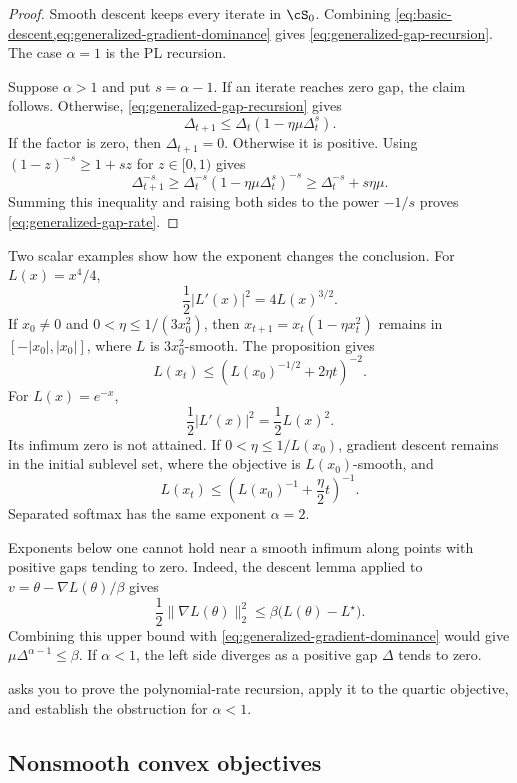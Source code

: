 \documentclass[11pt,twoside]{article}
\theoremstyle{definition}
\theoremstyle{remark}
\begin{document}
\begin{proof}
Smooth descent keeps every iterate in $\cS_0$. Combining
\cref{eq:basic-descent,eq:generalized-gradient-dominance} gives
\cref{eq:generalized-gap-recursion}. The case $\alpha=1$ is the PL
recursion.

Suppose $\alpha>1$ and put $s=\alpha-1$. If an iterate reaches zero gap, the
claim follows. Otherwise, \cref{eq:generalized-gap-recursion} gives
\[
 \Delta_{t+1}\le\Delta_t(1-\eta\mu\Delta_t^s).
\]
If the factor is zero, then $\Delta_{t+1}=0$. Otherwise it is positive. Using
$(1-z)^{-s}\ge1+sz$ for $z\in[0,1)$ gives
\[
 \Delta_{t+1}^{-s}
 \ge \Delta_t^{-s}(1-\eta\mu\Delta_t^s)^{-s}
 \ge \Delta_t^{-s}+s\eta\mu.
\]
Summing this inequality and raising both sides to the power $-1/s$ proves
\cref{eq:generalized-gap-rate}.
\end{proof}

Two scalar examples show how the exponent changes the conclusion. For
$L(x)=x^4/4$,
\[
 \frac12|L'(x)|^2=4L(x)^{3/2}.
\]
If $x_0\ne0$ and $0<\eta\le1/(3x_0^2)$, then
$x_{t+1}=x_t(1-\eta x_t^2)$ remains in $[-|x_0|,|x_0|]$, where $L$ is
$3x_0^2$-smooth. The proposition gives
\[
 L(x_t)\le\left(L(x_0)^{-1/2}+2\eta t\right)^{-2}.
\]
For $L(x)=e^{-x}$,
\[
 \frac12|L'(x)|^2=\frac12L(x)^2.
\]
Its infimum zero is not attained. If $0<\eta\le1/L(x_0)$, gradient descent
remains in the initial sublevel set, where the objective is $L(x_0)$-smooth,
and
\[
 L(x_t)\le\left(L(x_0)^{-1}+\frac\eta2t\right)^{-1}.
\]
Separated softmax has the same exponent $\alpha=2$.

Exponents below one cannot hold near a smooth infimum along points with
positive gaps tending to zero. Indeed, the descent lemma applied to
$v=\theta-\nabla L(\theta)/\beta$ gives
\[
 \frac12\|\nabla L(\theta)\|_2^2
 \le\beta\bigl(L(\theta)-L^\star\bigr).
\]
Combining this upper bound with
\cref{eq:generalized-gradient-dominance} would give
$\mu\Delta^{\alpha-1}\le\beta$. If $\alpha<1$, the left side diverges as a
positive gap $\Delta$ tends to zero.

 asks you to prove the polynomial-rate
recursion, apply it to the quartic objective, and establish the obstruction
for $\alpha<1$.

\subsection{Nonsmooth convex objectives}
\label{sec:nonsmooth-convex}
\end{document}
